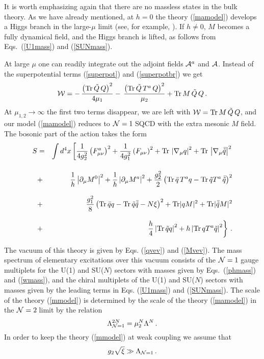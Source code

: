 \documentclass[epsfig,12pt]{article}
\def\beqn{\begin{eqnarray}}
\def\eeqn{\end{eqnarray}}
\def\beq{\begin{equation}}
\def\eeq{\end{equation}}
\newcommand{\ntwo}{${\cal N}=2\;$}
\newcommand{\none}{${\cal N}=1\;$}
\newcommand{\pt}{\partial}
\begin{document}
\vspace{2mm}

It is worth emphasizing again that there are no massless states in the bulk theory.
As we have already mentioned, at $h=0$ the theory (\ref{mamodel}) develops a Higgs branch in the large-$\mu$ limit (see, for example, \cite{SYnone}). If $h\ne 0$, $M$ becomes a fully dynamical field,
and the Higgs branch is lifted, as follows from Eqs.~(\ref{U1mass})
and (\ref{SUNmass}).

At large $\mu$ one can readily integrate out the adjoint fields ${\cal A}^a$ and  
${\cal A}$. Instead of the superpotential terms (\ref{superpot}) and (\ref{superpotbr})
we get
\beq
{\cal W} = -\, \frac{\left({\rm Tr}\, \tilde Q\,Q\right)^2}{4\mu_1}
 -\, \frac{\left({\rm Tr}\, \tilde Q\,T^a\,Q\right)^2}{\mu_2} + 
 {\rm Tr}\, M\,\tilde Q\,   Q \,.
 \label{instem}
\eeq
At $\mu_{1,2}\to \infty$ the first two terms disappear, we are left with
${\cal W} = {\rm Tr}\, M\, \tilde Q\,    Q$, 
and our model (\ref{mamodel}) reduces to \none SQCD with the 
extra mesonic $M$ field. The bosonic part of the action 
takes the form
\beqn
S&=&\int d^4x \left[\frac1{4g^2_2}
\left(F^{a}_{\mu\nu}\right)^2 +
\frac1{4g^2_1}\left(F_{\mu\nu}\right)^2+
{\rm Tr}\,\left|\nabla_{\mu}
q\right|^2 + {\rm Tr}\,\left|\nabla_{\mu} \bar{\tilde{q}}\right|^2
\right.
\nonumber\\[4mm]
&+& \frac1h \left|\pt_{\mu} M^0\right|^2+
\frac1h \left|\pt_{\mu} M^a\right|^2
+\frac{g^2_2}{2}
\left( 
 {\rm Tr}\,\bar{q}\,T^a q -
{\rm Tr}\,\tilde{q} T^a\,\bar{\tilde{q}}\right)^2
\nonumber\\[3mm]
&+& \frac{g^2_1}{8}
\left({\rm Tr}\,\bar{q} q - {\rm Tr}\,\tilde{q} \bar{\tilde{q}}-
N\xi\right)^2+
 {\rm Tr}|qM|^2 +{\rm Tr}|\bar{\tilde{q}}M|^2
\nonumber\\[3mm]
&+& 
\left.
\frac{h}{4}\left|{\rm Tr}\,\tilde{q}q\right|^2 
+h\left|{\rm Tr}\,qT^a\tilde{q}\right|^2 
\right\}
\,.
\label{mmodel}
\eeqn

The vacuum of this theory is given by Eqs. (\ref{qvev}) and (\ref{Mvev}).
The mass spectrum of elementary excitations over
this vacuum consists of the \none gauge multiplets for 
the U(1) and SU($N$) sectors with masses given by Eqs.~(\ref{phmass}) and 
(\ref{wmass}), and the chiral multiplets of the U(1) and SU($N$) 
sectors with masses given
by the leading terms in Eqs. (\ref{U1mass}) and (\ref{SUNmass}).
The scale of the theory (\ref{mmodel}) is determined by the scale of
the theory (\ref{mamodel}) in the \ntwo limit by the relation
\beq
\Lambda_{{\cal N}=1}^{2N}=\mu_2^N\Lambda^N\,.
\label{Lambda}
\eeq
In order to keep the theory (\ref{mmodel}) at weak coupling we assume that
\beq
g_2\sqrt{\xi}\gg\Lambda_{{\cal N}=1}\, .
\label{weakcoupl}
\eeq
\end{document}
